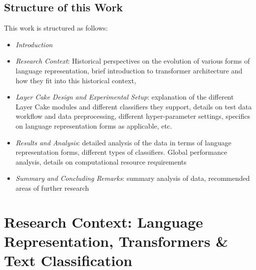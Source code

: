 \documentclass[final]{clv2025-revised}
\begin{document}
\subsection{Structure of this Work}
This work is structured as follows:
\begin{itemize}
	\setlength\itemsep{2pt} 
    \item \textit{Introduction}
    \item \textit{Research Context}: Historical perspectives on the evolution of various forms of language representation, brief introduction to transformer architecture and how they fit into this historical context, 
    \item \textit{Layer Cake Design and Experimental Setup}: explanation of the different Layer Cake modules and different classifiers they support, details on test data workflow and data preprocessing, different hyper-parameter settings, specifics on language representation forms as applicable, etc.  
    \item \textit{Results and Analysis}: detailed analysis of the data in terms of language representation forms, different types of classifiers. Global performance analysis, details on computational resource requirements
    \item \textit{Summary and Concluding Remarks}: summary analysis of data, recommended areas of further research
\end{itemize}


\section{Research Context: Language Representation, Transformers \& Text Classification}
\end{document}
